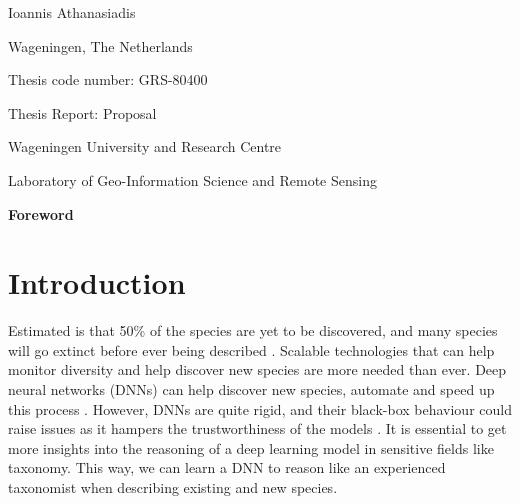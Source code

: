\documentclass[a4paper, 12pt, oneside]{book} %
\begin{document}
\begin{titlingpage}
\begin{center}
  {Ioannis Athanasiadis}\vspace{3.0cm}
  
  
  
  \end{center}
  
  \begin{center}
    {\thedate}
  
    {Wageningen, The Netherlands}
  \end{center}\vspace{5cm}

    Thesis code number: GRS-80400
  
    Thesis Report: Proposal
  
    {Wageningen University and Research Centre}
  
    {Laboratory of Geo-Information Science and Remote Sensing}
 \end{titlingpage}
\graphicspath{ {./figures/} }

\newpage
\thispagestyle{empty}
\textbf{Foreword}

\thispagestyle{empty}
\tableofcontents
\thispagestyle{empty}
\listoffigures
\thispagestyle{empty}
\listoftables
\thispagestyle{empty}
\newpage


\renewcommand{\thesection}{\arabic{section}}
\section{Introduction}

Estimated is that 50\% of the species are yet to be discovered, and many species will go extinct before ever being described \autocite{lees_species_2015}.
Scalable technologies that can help monitor diversity and help discover new species are more needed than ever.
Deep neural networks (DNNs) can help discover new species, automate and speed up this process \autocite{van_horn_inaturalist_2018}.
However, DNNs are quite rigid, and their black-box behaviour could raise issues as it hampers the trustworthiness of the models \autocite{carvalho_machine_2019}.
It is essential to get more insights into the reasoning of a deep learning model in sensitive fields like taxonomy.
This way, we can learn a DNN to reason like an experienced taxonomist when describing existing and new species.
\end{document}
